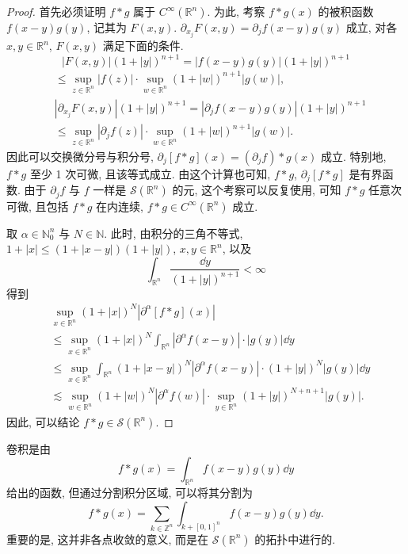 \begin{proof}
首先必须证明 $f * g$ 属于 $C^{\infty}(\mathbb{R}^{n})$. 为此, 考察 $f * g(x)$ 的被积函数 $f(x-y)g(y)$, 记其为 $F(x, y)$. $\partial_{x_{j}}F(x, y) = \partial_{j}f(x-y)g(y)$ 成立, 对各 $x, y \in \mathbb{R}^{n}$, $F(x, y)$ 满足下面的条件.
\[
|F(x, y)|(1+|y|)^{n+1} = |f(x-y)g(y)|(1+|y|)^{n+1}
\]
\begin{align*}
&\leq \sup_{z \in \mathbb{R}^{n}}|f(z)| \cdot \sup_{w \in \mathbb{R}^{n}}(1+|w|)^{n+1}|g(w)|, \\
&|\partial_{x_{j}}F(x, y)|(1+|y|)^{n+1} = |\partial_{j}f(x-y)g(y)|(1+|y|)^{n+1} \\
&\leq \sup_{z \in \mathbb{R}^{n}}|\partial_{j}f(z)| \cdot \sup_{w \in \mathbb{R}^{n}}(1+|w|)^{n+1}|g(w)|.
\end{align*}
因此可以交换微分号与积分号, $\partial_{j}[f*g](x) = (\partial_{j}f)*g(x)$ 成立. 特别地, $f * g$ 至少 1 次可微, 且该等式成立. 由这个计算也可知, $f * g$, $\partial_{j}[f*g]$ 是有界函数. 由于 $\partial_{j}f$ 与 $f$ 一样是 $\mathcal{S}(\mathbb{R}^{n})$ 的元, 这个考察可以反复使用, 可知 $f * g$ 任意次可微, 且包括 $f * g$ 在内连续, $f * g \in C^{\infty}(\mathbb{R}^{n})$ 成立.

取 $\alpha \in \mathbb{N}_{0}^{n}$ 与 $N \in \mathbb{N}$. 此时, 由积分的三角不等式, $1+|x| \leq (1+|x-y|)(1+|y|)$, $x, y \in \mathbb{R}^{n}$, 以及
\[
\int_{\mathbb{R}^{n}}\frac{\dd y}{(1+|y|)^{n+1}} < \infty
\]
得到
\begin{align}
&\sup_{x \in \mathbb{R}^{n}}(1+|x|)^{N}|\partial^{\alpha}[f*g](x)| \nonumber \\
&\leq \sup_{x \in \mathbb{R}^{n}}(1+|x|)^{N}\int_{\mathbb{R}^{n}}|\partial^{\alpha}f(x-y)| \cdot |g(y)|\dd y \nonumber \\
&\leq \sup_{x \in \mathbb{R}^{n}}\int_{\mathbb{R}^{n}}(1+|x-y|)^{N}|\partial^{\alpha}f(x-y)| \cdot (1+|y|)^{N}|g(y)|\dd y \nonumber \\
&\lesssim \sup_{w \in \mathbb{R}^{n}}(1+|w|)^{N}|\partial^{\alpha}f(w)| \cdot \sup_{y \in \mathbb{R}^{n}}(1+|y|)^{N+n+1}|g(y)|.
\tag{5.3}
\label{eq:5.3}
\end{align}
因此, 可以结论 $f * g \in \mathcal{S}(\mathbb{R}^{n})$.
\end{proof}

卷积是由
\[
f * g(x) = \int_{\mathbb{R}^{n}}f(x-y)g(y)\dd y
\]
给出的函数, 但通过分割积分区域, 可以将其分割为
\[
f * g(x) = \sum_{k \in \mathbb{Z}^{n}}\int_{k+[0,1]^{n}}f(x-y)g(y)\dd y.
\]
重要的是, 这并非各点收敛的意义, 而是在 $\mathcal{S}(\mathbb{R}^{n})$ 的拓扑中进行的.


